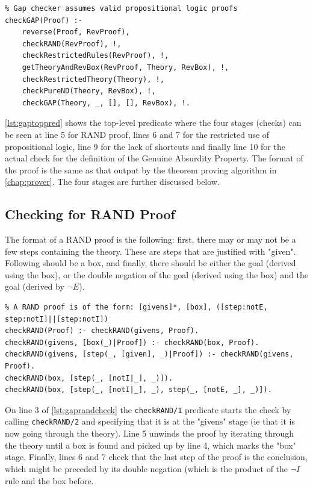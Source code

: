 \documentclass[11pt,twoside,a4paper]{report}
\begin{document}
\begin{lstlisting}[caption={Genuine Absurdity Property top level predicate},label=lst:gaptoppred]
% Checks that the given proof follows the GAP property
% Gap checker assumes valid propositional logic proofs
checkGAP(Proof) :- 
	reverse(Proof, RevProof), 
	checkRAND(RevProof), !,
	checkRestrictedRules(RevProof), !,
	getTheoryAndRevBox(RevProof, Theory, RevBox), !,
	checkRestrictedTheory(Theory), !,
	checkPureND(Theory, RevBox), !,
	checkGAP(Theory, _, [], [], RevBox), !.
\end{lstlisting}

\autoref{lst:gaptoppred} shows the top-level predicate where the four stages (checks) can be seen at line 5 for RAND proof, lines 6 and 7 for the restricted use of propositional logic, line 9 for the lack of shortcuts and finally line 10 for the actual check for the definition of the Genuine Absurdity Property. The format of the proof is the same as that output by the theorem proving algorithm in \autoref{chap:prover}. The four stages are further discussed below.

\subsection{Checking for RAND Proof}
The format of a RAND proof is the following: first, there may or may not be a few steps containing the theory. These are steps that are justified with "given". Following should be a box, and finally, there should be either the goal (derived using the box), or the double negation of the goal (derived using the box) and the goal (derived by $\neg E$).

\begin{lstlisting}[caption={Checking whether a proof is a RAND proof},label=lst:gaprandcheck]
% Checks to see if this proof is a RAND proof to start with
% A RAND proof is of the form: [givens]*, [box], ([step:notE, step:notI]||[step:notI])
checkRAND(Proof) :- checkRAND(givens, Proof).
checkRAND(givens, [box(_)|Proof]) :- checkRAND(box, Proof).
checkRAND(givens, [step(_, [given], _)|Proof]) :- checkRAND(givens, Proof).
checkRAND(box, [step(_, [notI|_], _)]).
checkRAND(box, [step(_, [notI|_], _), step(_, [notE, _], _)]).
\end{lstlisting}

On line 3 of \autoref{lst:gaprandcheck} the \lstinline$checkRAND/1$ predicate starts the check by calling \lstinline$checkRAND/2$ and specifying that it is at the "givens" stage (ie that it is now going through the theory). Line 5 unwinds the proof by iterating through the theory until a box is found and picked up by line 4, which marks the "box" stage. Finally, lines 6 and 7 check that the last step of the proof is the conclusion, which might be preceded by its double negation (which is the product of the $\neg I$ rule and the box before.
\end{document}
